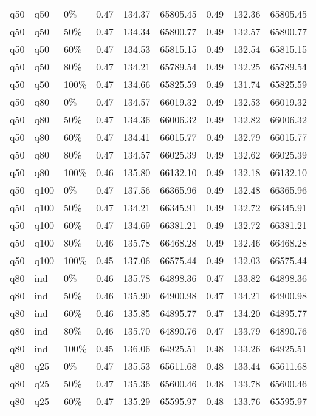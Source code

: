 \begin{longtable}{lllrrrrrr}
  q50 & q50 & 0\% & 0.47 & 134.37 & 65805.45 & 0.49 & 132.36 & 65805.45 \\ 
  q50 & q50 & 50\% & 0.47 & 134.34 & 65800.77 & 0.49 & 132.57 & 65800.77 \\ 
  q50 & q50 & 60\% & 0.47 & 134.53 & 65815.15 & 0.49 & 132.54 & 65815.15 \\ 
  q50 & q50 & 80\% & 0.47 & 134.21 & 65789.54 & 0.49 & 132.25 & 65789.54 \\ 
  q50 & q50 & 100\% & 0.47 & 134.66 & 65825.59 & 0.49 & 131.74 & 65825.59 \\ 
  q50 & q80 & 0\% & 0.47 & 134.57 & 66019.32 & 0.49 & 132.53 & 66019.32 \\ 
  q50 & q80 & 50\% & 0.47 & 134.36 & 66006.32 & 0.49 & 132.82 & 66006.32 \\ 
  q50 & q80 & 60\% & 0.47 & 134.41 & 66015.77 & 0.49 & 132.79 & 66015.77 \\ 
  q50 & q80 & 80\% & 0.47 & 134.57 & 66025.39 & 0.49 & 132.62 & 66025.39 \\ 
  q50 & q80 & 100\% & 0.46 & 135.80 & 66132.10 & 0.49 & 132.18 & 66132.10 \\ 
  q50 & q100 & 0\% & 0.47 & 137.56 & 66365.96 & 0.49 & 132.48 & 66365.96 \\ 
  q50 & q100 & 50\% & 0.47 & 134.21 & 66345.91 & 0.49 & 132.72 & 66345.91 \\ 
  q50 & q100 & 60\% & 0.47 & 134.69 & 66381.21 & 0.49 & 132.72 & 66381.21 \\ 
  q50 & q100 & 80\% & 0.46 & 135.78 & 66468.28 & 0.49 & 132.46 & 66468.28 \\ 
  q50 & q100 & 100\% & 0.45 & 137.06 & 66575.44 & 0.49 & 132.03 & 66575.44 \\ 
  q80 & ind & 0\% & 0.46 & 135.78 & 64898.36 & 0.47 & 133.82 & 64898.36 \\ 
  q80 & ind & 50\% & 0.46 & 135.90 & 64900.98 & 0.47 & 134.21 & 64900.98 \\ 
  q80 & ind & 60\% & 0.46 & 135.85 & 64895.77 & 0.47 & 134.20 & 64895.77 \\ 
  q80 & ind & 80\% & 0.46 & 135.70 & 64890.76 & 0.47 & 133.79 & 64890.76 \\ 
  q80 & ind & 100\% & 0.45 & 136.06 & 64925.51 & 0.48 & 133.26 & 64925.51 \\ 
  q80 & q25 & 0\% & 0.47 & 135.53 & 65611.68 & 0.48 & 133.44 & 65611.68 \\ 
  q80 & q25 & 50\% & 0.47 & 135.36 & 65600.46 & 0.48 & 133.78 & 65600.46 \\ 
  q80 & q25 & 60\% & 0.47 & 135.29 & 65595.97 & 0.48 & 133.76 & 65595.97 \\ 

\end{longtable}
